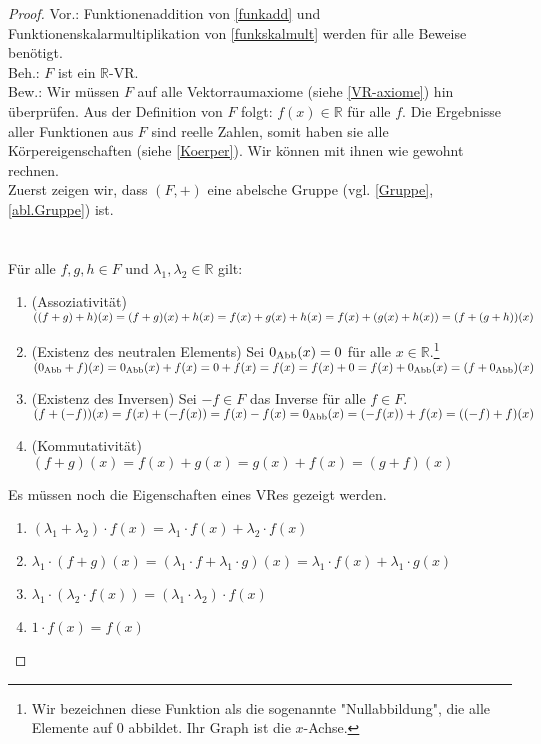 \begin{proof}
Vor.: Funktionenaddition von \ref{funkadd} und Funktionenskalarmultiplikation von \ref{funkskalmult} werden für alle Beweise benötigt.
\\ Beh.: $F$ ist ein $\mathbb{R}$-\acl{VR}.
\\ Bew.: Wir müssen $F$ auf alle Vektorraumaxiome (siehe \ref{VR-axiome}) hin überprüfen. Aus der Definition von $F$ folgt: \(f(x) \in \mathbb{R}\) für alle $f$. Die Ergebnisse aller Funktionen aus $F$ sind reelle Zahlen, somit haben sie alle Körpereigenschaften (siehe \ref{Koerper}). Wir können mit ihnen wie gewohnt rechnen.
\\Zuerst zeigen wir, dass $(F,+)$ eine abelsche Gruppe (vgl. \ref{Gruppe}, \ref{abl.Gruppe}) ist.
\\
\\
\\Für alle $f,g,h \in F$ und $\lambda_1, \lambda_2 \in \mathbb{R}$ gilt:
\begin{enumerate}
\item (Assoziativität)
\(((f+g)+h)(x)=(f+g)(x)+h(x)=f(x)+g(x)+h(x)=\\f(x)+(g(x)+h(x))=(f+(g+h))(x)\)
\item(Existenz des neutralen Elements) Sei $0_{\operatorname{Abb}}(x)=0$ für alle $x \in \mathbb{R}$.\footnote{Wir bezeichnen diese Funktion als die sogenannte "Nullabbildung", die alle Elemente auf $0$ abbildet. Ihr Graph ist die $x$-Achse.} \\ \( (0_{\operatorname{Abb}}+f)(x) = 0_{\operatorname{Abb}}(x) + f(x)= 0+ f(x)=f(x)=f(x)+0=f(x)+ 0_{\operatorname{Abb}}(x)=(f+0_{\operatorname{Abb}})(x) \)
\item(Existenz des Inversen) Sei $-f \in F$ das Inverse für alle $f\in F$.\\ \( (f+(-f))(x) =  f(x) + (-f(x))= f(x)-f(x) = 0_{\operatorname{Abb}}(x) =  (-f(x)) + f(x)= ((-f) + f)(x)\) 
\item(Kommutativität) \((f+g)(x)=f(x)+g(x)=g(x)+f(x)=(g+f)(x)\)
\end{enumerate}

Es müssen noch die Eigenschaften eines \acl{VR}es gezeigt werden.
\begin{enumerate}
\item \((\lambda_1+\lambda_2)\cdot f(x) = \lambda_1 \cdot f(x) + \lambda_2 \cdot  f(x)\)
\item \( \lambda_1 \cdot (f + g)(x) = (\lambda_1 \cdot f + \lambda_1 \cdot  g)(x) = \lambda_1 \cdot f(x) + \lambda_1 \cdot  g(x)\)
\item \( \lambda_1 \cdot (\lambda_2 \cdot f(x)) = (\lambda_1 \cdot \lambda_2) \cdot f(x) \)
\item \(1 \cdot f(x) = f(x)\)
\end{enumerate}
\end{proof}
\newpage


